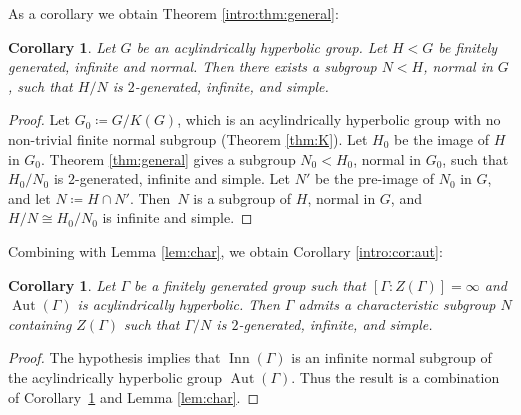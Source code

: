 \documentclass[11pt]{article}
\newtheorem{corollary}[theorem]{Corollary}
\theoremstyle{definition}
\newcommand{\Aut}{\operatorname{Aut}}
\newcommand{\Inn}{\operatorname{Inn}}
\begin{document}
As a corollary we obtain Theorem \ref{intro:thm:general}:

\begin{corollary}
\label{cor:general}
Let $G$ be an acylindrically hyperbolic group. Let $H < G$ be finitely generated, infinite and normal. Then there exists a subgroup $N < H$, normal in $G$, such that $H/N$ is $2$-generated, infinite, and simple.
\end{corollary}

\begin{proof}
Let $G_0 \coloneqq G/K(G)$, which is an acylindrically hyperbolic group with no non-trivial finite normal subgroup (Theorem \ref{thm:K}).
Let $H_0$ be the image of $H$ in $G_0$.
Theorem \ref{thm:general} gives a subgroup $N_0 < H_0$, normal in $G_0$, such that $H_0 / N_0$ is $2$-generated, infinite and simple.
Let $N'$ be the pre-image of $N_0$ in $G$, and let $N \coloneqq H \cap N'$.
Then~$N$ is a subgroup of $H$, normal in $G$, and $H/N \cong H_0 / N_0$ is infinite and simple.
\end{proof}

Combining with Lemma \ref{lem:char}, we obtain Corollary \ref{intro:cor:aut}:

\begin{corollary}
\label{cor:aut}
Let $\Gamma$ be a finitely generated group such that $[\Gamma : Z(\Gamma)] = \infty$ and $\Aut(\Gamma)$ is acylindrically hyperbolic.
Then $\Gamma$ admits a characteristic subgroup $N$ containing $Z(\Gamma)$ such that $\Gamma / N$ is $2$-generated, infinite, and simple.
\end{corollary}

\begin{proof}
The hypothesis implies that $\Inn(\Gamma)$ is an infinite normal subgroup of the acylindrically hyperbolic group $\Aut(\Gamma)$. Thus the result is a combination of Corollary~\ref{cor:general} and Lemma \ref{lem:char}.
\end{proof}
\end{document}
